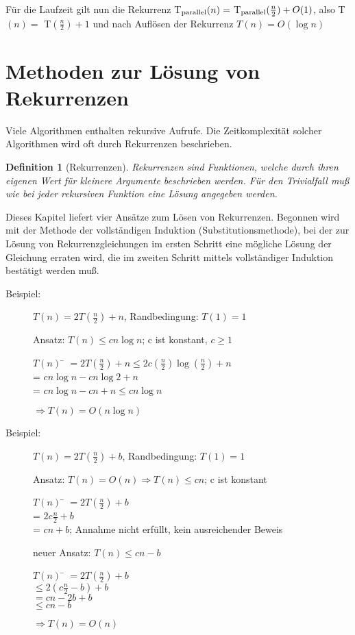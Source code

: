 \documentclass[ngerman,draft,parskip=half*,twoside]{scrreprt}
\theoremstyle{break}
\newtheorem{definition}{Definition}
\begin{document}
$  $

Für die Laufzeit gilt nun die Rekurrenz T$_{\textup{parallel}}(n) =$ T$_{\textup{parallel}}(\frac{n}{2}) + O(1)$,
also T$(n)=$ T$(\frac{n}{2})+1$ und nach Auflösen der Rekurrenz $T(n) = O(\log n)$

\section{Methoden zur Lösung von Rekurrenzen}
Viele Algorithmen enthalten rekursive Aufrufe. Die Zeitkomplexität solcher Algorithmen wird oft durch Rekurrenzen beschrieben.
\begin{definition}[Rekurrenzen]
Rekurrenzen sind Funktionen, welche durch ihren eigenen Wert für kleinere Argumente beschrieben werden. Für den Trivialfall muß wie
bei jeder rekursiven Funktion eine Lösung angegeben werden.
\end{definition}
Dieses Kapitel liefert vier Ansätze zum Lösen von Rekurrenzen.
%
%
Begonnen wird mit der Methode der vollständigen Induktion (Substitutionsmethode),
bei der zur Lösung von Rekurrenzgleichungen im ersten Schritt eine mögliche Lösung der Gleichung erraten wird,
die im zweiten Schritt mittels vollständiger Induktion bestätigt werden muß.		

	\begin{description}
		\item [Beispiel:] $T(n) = 2 T\left(\frac{n}{2}\right) + n$, Randbedingung: $T(1)=1$

		Ansatz: $T(n) \leq c n \log n$; c ist konstant, $c \geq 1$
		\begin{tabbing}
			$T(n)$ \= $= 2 T\left(\frac{n}{2}\right)+n\leq 2 c \left(\frac{n}{2}\right) \log\left(\frac{n}{2}\right)+n$\\
			\> = $c n \log n-c n \log 2+n$\\
			\> = $c n \log n-c n+n \leq c n \log n$\\
		\end{tabbing}
		$\Rightarrow T(n)=O(n \log n)$
	\end{description}

	\begin{description}
		\item [Beispiel:] $T(n) = 2 T\left(\frac{n}{2}\right) + b$, Randbedingung: $T(1)=1$

		Ansatz: $T(n)=O(n)\Rightarrow T(n)\leq c n$; c ist konstant
		\begin{tabbing}
			$T(n)$ \= $= 2 T(\frac{n}{2})+b$\\
			\> = $2c \frac{n}{2} +b$\\
			\> = $c n+b$; Annahme nicht erfüllt, kein ausreichender Beweis
		\end{tabbing}
		neuer Ansatz: $T(n)\leq c n-b$
		\begin{tabbing}
			$T(n)$ \= $=2 T\left(\frac{n}{2} \right)+b$\\
			\> $\leq 2\left(c \frac{n}{2}-b\right)+b$\\
			\> $=c n-2 b+b$\\
			\> $\leq c n-b$
		\end{tabbing}
		$\Rightarrow T(n)=O(n)$
	\end{description}
			
\end{document}
